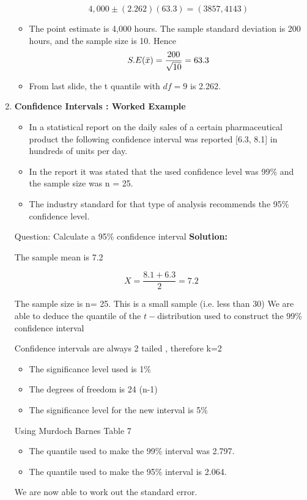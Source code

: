 \documentclass[]{report}
\begin{document}
\begin{enumerate}
\begin{itemize}
\[4,000\pm(2.262)(63.3)  = (3857,4143)\]

\item The point estimate is 4,000 hours. The sample standard deviation is 200 hours, and the sample size is 10. Hence
\[S.E(\bar{x} ) = { 200 \over \sqrt{10}} = 63.3\]

\item From last slide, the t quantile with $df=9$ is 2.262.
\end{itemize}

\item \textbf{Confidence Intervals : Worked Example}\\

\begin{itemize} 
\item In a statistical report on the daily sales of a certain pharmaceutical product the following confidence interval was reported [6.3, 8.1] in hundreds of units per day.

\item In the report it was stated that the used confidence level was 99\% and the sample size was n = 25. 
\item The industry standard for that type of analysis recommends the 95\% confidence level.
\end{itemize}
Question: Calculate a 95\% confidence interval
\textbf{Solution:}

The sample mean is 7.2

\[X=\frac{8.1 + 6.3}{2}=7.2\]

The sample size is n= 25. This is a small sample (i.e. less than 30)
We are able to deduce the quantile of the $t-$distribution used to construct the 99\% confidence interval

Confidence intervals are always 2 tailed , therefore k=2
\begin{itemize}
\item The significance level used is 1\%
\item The degrees of freedom  is 24 (n-1)
\item The significance level for the new interval is 5\%
\end{itemize}
Using Murdoch Barnes Table 7
\begin{itemize}
\item The quantile used to make the 99\% interval was 2.797.
\item The quantile used to make the 95\% interval is 2.064.
\end{itemize}
We are now able to work out the standard error.



\end{enumerate}
\end{document}
